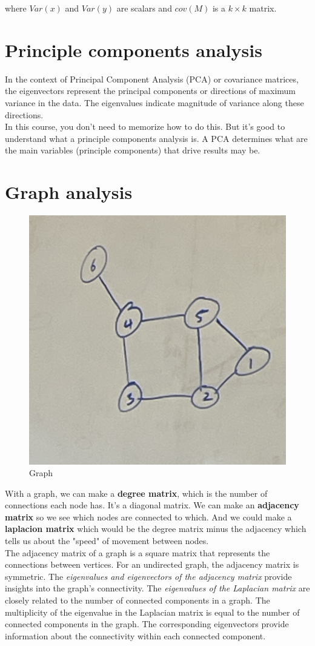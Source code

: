 \documentclass{article}
\begin{document}
where $Var(x)$ and $Var(y)$ are scalars and $cov(M)$ is a $k \times k$ matrix. 

\section{Principle components analysis}
In the context of Principal Component Analysis (PCA) or covariance matrices, the eigenvectors represent the principal components or directions of maximum variance in the data. The eigenvalues indicate magnitude of variance along these directions. \\

In this course, you don't need to memorize how to do this. But it's good to understand what a principle components analysis is. A PCA determines what are the main variables (principle components) that drive results may be. 

\section{Graph analysis}

\begin{figure}[htp]
    \centering
    \includegraphics[width=0.5\linewidth]{Screen Shot 2023-11-29 at 11.37.38 AM.png}
    \caption{Graph}
    \label{fig:enter-label}
\end{figure}

With a graph, we can make a \textbf{degree matrix}, which is the number of connections each node has. It's a diagonal matrix. We can make an \textbf{adjacency matrix} so we see which nodes are connected to which. And we could make a \textbf{laplacion matrix} which would be the degree matrix minus the adjacency which tells us about the "speed" of movement between nodes. \\

The adjacency matrix of a graph is a square matrix that represents the connections between vertices. For an undirected graph, the adjacency matrix is symmetric. The \textit{eigenvalues and eigenvectors of the adjacency matrix} provide insights into the graph's connectivity. The \textit{eigenvalues of the Laplacian matrix} are closely related to the number of connected components in a graph. The multiplicity of the eigenvalue in the Laplacian matrix is equal to the number of connected components in the graph. The corresponding eigenvectors provide information about the connectivity within each connected component.
\end{document}
